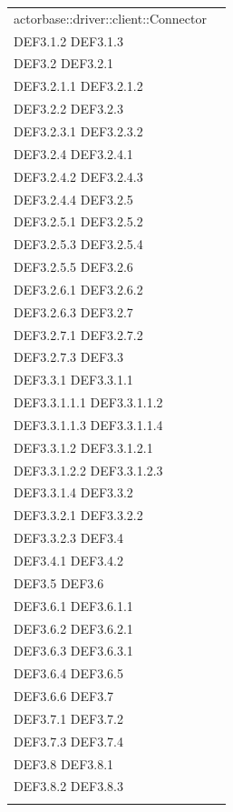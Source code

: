 \documentclass{scalatekids-article}
\begin{document}
\begin{longtable}[H]{|p{12cm}|p{5.5cm}|}
actorbase::driver::client::Connector & \multiLineCell[t]{DEF3.1 DEF3.1.1\\DEF3.1.2 DEF3.1.3\\DEF3.2 DEF3.2.1\\DEF3.2.1.1 DEF3.2.1.2\\DEF3.2.2 DEF3.2.3\\DEF3.2.3.1 DEF3.2.3.2\\DEF3.2.4 DEF3.2.4.1\\DEF3.2.4.2 DEF3.2.4.3\\DEF3.2.4.4 DEF3.2.5\\DEF3.2.5.1 DEF3.2.5.2\\DEF3.2.5.3 DEF3.2.5.4\\DEF3.2.5.5 DEF3.2.6\\DEF3.2.6.1 DEF3.2.6.2\\DEF3.2.6.3 DEF3.2.7\\DEF3.2.7.1 DEF3.2.7.2\\DEF3.2.7.3 DEF3.3\\DEF3.3.1 DEF3.3.1.1\\DEF3.3.1.1.1 DEF3.3.1.1.2\\DEF3.3.1.1.3 DEF3.3.1.1.4\\DEF3.3.1.2 DEF3.3.1.2.1\\DEF3.3.1.2.2 DEF3.3.1.2.3\\DEF3.3.1.4 DEF3.3.2\\DEF3.3.2.1 DEF3.3.2.2\\DEF3.3.2.3 DEF3.4\\DEF3.4.1 DEF3.4.2\\DEF3.5 DEF3.6\\DEF3.6.1 DEF3.6.1.1\\DEF3.6.2 DEF3.6.2.1\\DEF3.6.3 DEF3.6.3.1\\DEF3.6.4 DEF3.6.5\\DEF3.6.6 DEF3.7\\DEF3.7.1 DEF3.7.2\\DEF3.7.3 DEF3.7.4\\DEF3.8 DEF3.8.1\\DEF3.8.2 DEF3.8.3\\}\\
\hline

\end{longtable}
\end{document}
